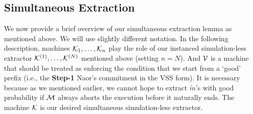 \subsection{Simultaneous Extraction}
\label{sec:simultaneous-ext:overview}

We now provide a brief overview of our simultaneous extraction lemma as mentioned above. We will use slightly different notation. In the following description, machines $\mathcal{K}_1, \ldots,\mathcal{K}_n$ play the role of our instanced simulation-less extractor $\mathcal{K}^{(1)}, \ldots, \mathcal{K}^{(N)}$ mentioned above (setting $n = N$). And $\mathcal{V}$ is a machine that should be treated as enforcing the condition that we start from a `good' prefix (i.e., the {\bf Step-1} Naor's commitment in the VSS form). It is necessary because as we mentioned earlier, we cannot hope to extract $\tilde{m}$'s with good probability if $\mathcal{M}$ always aborts the execution before it naturally ends. The machine $\mathcal{K}$ is our desired simultaneous simulation-less extractor.


